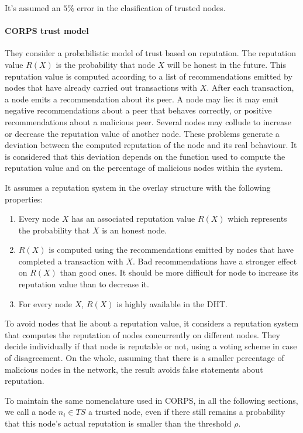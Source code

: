 It's assumed an $5\%$ error in the clasification of trusted nodes.


\paragraph{CORPS trust model}
They consider a probabilistic model of trust based on reputation.
The reputation value $R(X)$ is the probability that node $X$ will
be honest in the future. This reputation value is computed
according to a list of recommendations emitted by nodes that
have already carried out transactions with $X$.
After each transaction, a node emits a recommendation
about its peer. A node may lie: it may emit negative
recommendations about a peer that behaves correctly, or
positive recommendations about a malicious peer. Several nodes
may collude to increase or decrease the reputation value of
another node. These problems generate a deviation between
the computed reputation of the node and its real behaviour. It is
considered that this deviation depends on the function used to
compute the reputation value and on the percentage of malicious
nodes within the system.

It assumes a reputation system in the overlay structure with the following properties:
\begin{enumerate}
  \item Every node $X$ has an associated reputation value $R(X)$
  which represents the probability that $X$ is an honest node.
  \item $R(X)$ is computed using the recommendations emitted
  by nodes that have completed a transaction with $X$. Bad
  recommendations have a stronger effect on $R(X)$ than
  good ones. It should be more difficult for node to
  increase its reputation value than to decrease it.
  \item For every node $X$, $R(X)$ is highly available in the DHT.
\end{enumerate}

To avoid nodes that lie about a reputation value, it considers a reputation
system that computes the reputation of nodes concurrently on different nodes.
They decide individually if that node is reputable or not, using a voting
scheme in case of disagreement. On the whole, assuming that there is a smaller
percentage of malicious nodes in the network, the result avoids
false statements about reputation.

To maintain the same nomenclature used in CORPS, in all the following sections,
we call a node $n_i \in TS$ a trusted node, even if there still remains a
probability that this node's actual reputation is smaller than the threshold
$\rho$.
 
